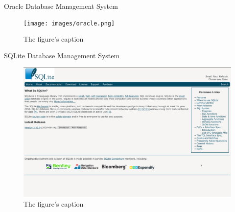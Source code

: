 \documentclass[14pt,aspectratio=169]{beamer}
\begin{document}
%
\begin{frame}{Oracle Database Management System}
  \begin{figure}
    \centering
    \texttt{[image: images/oracle.png]}
    \caption{The figure's caption}
  \end{figure}
\end{frame}

%
\begin{frame}{SQLite Database Management System}
  \begin{figure}
    \centering
    \includegraphics[scale=.0825]{images/sqlite.png}
    \caption{The figure's caption}
  \end{figure}
\end{frame}
\end{document}
